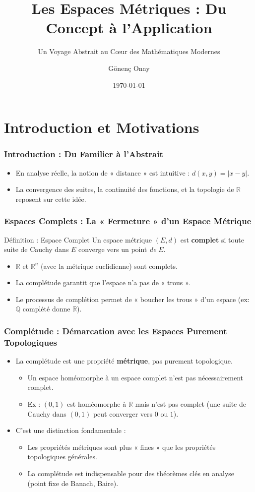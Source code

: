 \documentclass{beamer}
\title{\textbf{Les Espaces Métriques : Du Concept à l'Application}}
\subtitle{Un Voyage Abstrait au C\oe ur des Mathématiques Modernes}
\author{Gönenç Onay}
\institute{Université Galatasaray, Département de Mathématiques}
\date{\today}
\begin{document}
\sloppy

\frame{\titlepage}

\section*{Introduction et Motivations}
\begin{frame}
\frametitle{Introduction : Du Familier à l'Abstrait}
\begin{itemize}
	\item En analyse réelle, la notion de « distance » est intuitive : $d(x,y) = |x-y|$.
	\item La convergence des suites, la continuité des fonctions, et la topologie de $\mathbb{R}$ reposent sur cette idée.
\end{itemize}
\end{frame}

\begin{frame}
	\frametitle{Espaces Complets : La « Fermeture » d'un Espace Métrique}
	\begin{block}{Définition : Espace Complet}
		Un espace métrique $(E, d)$ est \textbf{complet} si toute suite de Cauchy dans $E$ converge vers un point \textit{de} $E$.
	\end{block}
	\begin{itemize}
		\item $\mathbb{R}$ et $\mathbb{R}^n$ (avec la métrique euclidienne) sont complets.
		\item La complétude garantit que l'espace n'a pas de « trous ».
		\item Le processus de complétion permet de « boucher les trous » d'un espace (ex: $\mathbb{Q}$ complété donne $\mathbb{R}$).
	\end{itemize}
\end{frame}

\begin{frame}
	\frametitle{Complétude : Démarcation avec les Espaces Purement Topologiques}
	\begin{itemize}
		\item La complétude est une propriété \textbf{métrique}, pas purement topologique.
		      \begin{itemize}
			      \item Un espace homéomorphe à un espace complet n'est pas nécessairement complet.
			      \item Ex : $(0,1)$ est homéomorphe à $\mathbb{R}$ mais n'est pas complet (une suite de Cauchy dans $(0,1)$ peut converger vers $0$ ou $1$).
		      \end{itemize}
		\item C'est une distinction fondamentale :
		      \begin{itemize}
			      \item Les propriétés métriques sont plus « fines » que les propriétés topologiques générales.
			      \item La complétude est indispensable pour des théorèmes clés en analyse (point fixe de Banach, Baire).
		      \end{itemize}
	\end{itemize}
\end{frame}
\end{document}
